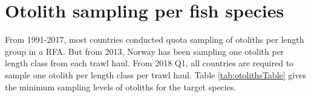 \documentclass[a4paper 12pt]{article}
\numberwithin{equation}{section}
\begin{document}
\section{\large Otolith sampling per fish species}
\label{secAp:otolithappendix}
From 1991-2017, most countries conducted quota sampling of otoliths per length group in a RFA. But from 2013, Norway has been sampling one otolith per length class from each trawl haul. From 2018 Q1, all countries are required to sample one otolith per length class per trawl haul.  Table \ref{tab:otolithsTable} gives the minimum sampling levels of otoliths for the target species.\\ %
\end{document}

